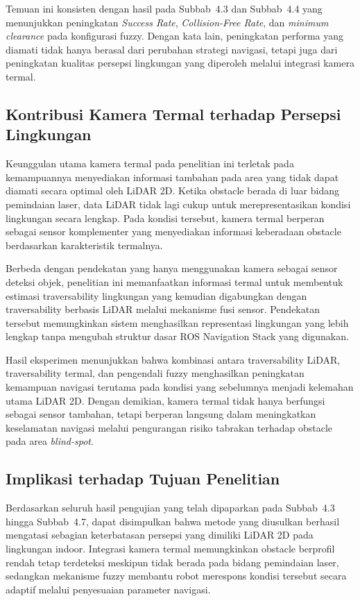 Temuan ini konsisten dengan hasil pada Subbab~4.3 dan Subbab~4.4 yang menunjukkan peningkatan \textit{Success Rate}, \textit{Collision-Free Rate}, dan \textit{minimum clearance} pada konfigurasi fuzzy. Dengan kata lain, peningkatan performa yang diamati tidak hanya berasal dari perubahan strate\-gi navigasi, tetapi juga dari peningkatan kualitas persepsi lingkungan yang diperoleh melalui integrasi kamera termal.

\subsection{Kontribusi Kamera Termal terhadap Persepsi Lingkungan}

Keunggulan utama kamera termal pada penelitian ini terletak pada kemampuannya menyediakan informasi tambahan pada area yang tidak dapat diamati secara optimal oleh LiDAR 2D. Ketika obstacle berada di luar bidang pemindaian laser, data LiDAR tidak lagi cukup untuk merepresentasikan kondisi lingkungan secara lengkap. Pada kondisi tersebut, kamera termal berperan sebagai sensor komplementer yang menyediakan informasi keberadaan obstacle berdasarkan karakteristik termalnya.

Berbeda dengan pendekatan yang hanya menggunakan kamera sebagai sensor deteksi objek, penelitian ini memanfaatkan informasi termal untuk membentuk estimasi traversability lingkungan yang kemudian digabungkan dengan traversability berbasis LiDAR melalui meka\-nisme fusi sensor. Pendekatan tersebut memungkinkan sistem menghasilkan representasi lingk\-ungan yang lebih lengkap tanpa mengubah struktur dasar ROS Navigation Stack yang digunakan.

Hasil eksperimen menunjukkan bahwa kombinasi antara traversability LiDAR, traversability termal, dan pengendali fuzzy menghasilkan peningkatan kemampuan navigasi terutama pada kondisi yang sebelumnya menjadi kelemahan utama LiDAR 2D. Dengan demikian, kamera termal tidak hanya berfungsi sebagai sensor tambahan, tetapi berperan langsung dalam meningkatkan keselamatan navigasi melalui pengurangan risiko tabrakan terhadap obstacle pada area \textit{blind-spot}.

\subsection{Implikasi terhadap Tujuan Penelitian}

Berdasarkan seluruh hasil pengujian yang telah dipaparkan pada Subbab~4.3 hingga Subbab~4.7, dapat disimpulkan bahwa metode yang diusulkan berhasil mengatasi sebagian keterbatasan persepsi yang dimiliki LiDAR 2D pada lingkungan indoor. Integrasi kamera termal memungkinkan obstacle berprofil rendah tetap terdeteksi meskipun tidak berada pada bidang pemindaian laser, sedangkan mekanisme fuzzy membantu robot merespons kondisi tersebut secara adaptif melalui penyesuaian parameter navigasi.

